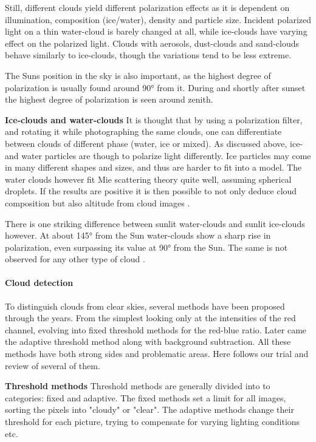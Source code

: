 \documentclass[]{book}
\begin{document}
		Still, different clouds yield different polarization effects as it is dependent on illumination, composition (ice/water), density and particle size. Incident polarized light on a thin water-cloud is barely changed at all, while ice-clouds have varying effect on the polarized light. Clouds with aerosols, dust-clouds and sand-clouds behave similarly to ice-clouds, though the variations tend to be less extreme.
		
		The Suns position in the sky is also important, as the highest degree of polarization is usually found around 90° from it. During and shortly after sunset the highest degree of polarization is seen around zenith.
		
		\textbf{Ice-clouds and water-clouds}
		It is thought that by using a polarization filter, and rotating it while photographing the same clouds, one can differentiate between clouds of different phase (water, ice or mixed).
		As discussed above, ice- and water particles are though to polarize light differently. Ice particles may come in many different shapes and sizes, and thus are harder to fit into a model. The water clouds however fit Mie scattering theory quite well, assuming spherical droplets. If the results are positive it is then possible to not only deduce cloud composition but also altitude from cloud images \cite{Reflection}.
		
		There is one striking difference between sunlit water-clouds and sunlit ice-clouds however. At about 145° from the Sun water-clouds show a sharp rise in polarization, even surpassing its value at 90° from the Sun. The same is not observed for any other type of cloud \cite{Polarized}.
		
		\paragraph{Cloud detection}
		To distinguish clouds from clear skies, several methods have been proposed through the years. From the simplest looking only at the intensities of the red channel, evolving into fixed threshold methods for the red-blue ratio. Later came the adaptive threshold method along with background subtraction. All these methods have both strong sides and problematic areas. Here follows our trial and review of several of them.
		
		\textbf{Threshold methods}
		Threshold methods are generally divided into to categories: fixed and adaptive. The fixed methods set a limit for all images, sorting the pixels into "cloudy" or "clear". The adaptive methods change their threshold for each picture, trying to compensate for varying lighting conditions etc.
		
\end{document}
